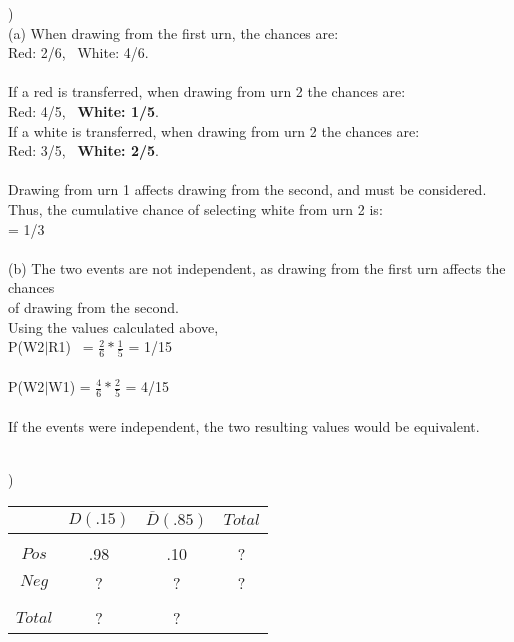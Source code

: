 \documentclass[12pt]{article}
\begin{document}
)\\
\indent (a) When drawing from the first urn, the chances are:\\
\indent \indent Red: 2/6, \ White: 4/6.\\\\
\indent \indent If a red is transferred, when drawing from urn 2 the chances are: \\
\indent \indent Red: 4/5, \ \textbf{White: 1/5}.\\
\indent \indent If a white is transferred, when drawing from urn 2 the chances are: \\
\indent \indent Red: 3/5, \ \textbf{White: 2/5}.\\\\
\indent \indent Drawing from urn 1 affects drawing from the second, and must be considered.\\
\indent \indent Thus, the cumulative chance of selecting white from urn 2 is:\\ 
\indent {} = 1/3\\\\

\indent (b) The two events are not independent, as drawing from the first urn affects the chances\\
\indent \indent  of drawing from the second.\\
\indent \indent Using the values calculated above, \\
\indent \indent P(W2$|$R1) \ = {\Large$ \frac{2}{6}*\frac{1}{5}$} = 1/15\\\\
\indent \indent P(W2$|$W1) = {\Large$ \frac{4}{6}*\frac{2}{5}$} = 4/15\\\\
\indent \indent If the events were independent, the two resulting values would be equivalent.


\noindent \hrulefill \\


)
\begin{tabular}{c|cc|c}
 & $D(.15)$ & $\overline{D}(.85)$ & $Total$ \\
 \hline &&&\\[-1em]
$Pos$ & .98 & .10 & ?\\
$Neg$ & ? & ? & ?\\
 \hline &&&\\[-1em]
 $Total$ & ? & ? & 
\end{tabular}
\end{document}
